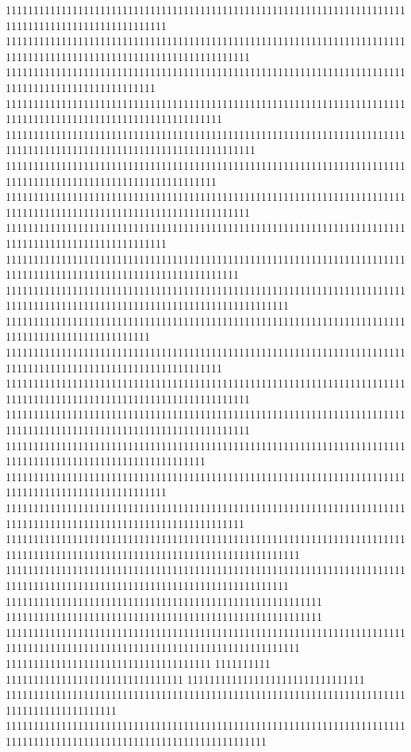 11111111111111111111111111111111111111111111111111111111111111111111111111111111111111111111111111111
11111111111111111111111111111111111111111111111111111111111111111111111111111111111111111111111111111111111111111111
111111111111111111111111111111111111111111111111111111111111111111111111111111111111111111111111111
111111111111111111111111111111111111111111111111111111111111111111111111111111111111111111111111111111111111111
111111111111111111111111111111111111111111111111111111111111111111111111111111111111111111111111111111111111111111111
11111111111111111111111111111111111111111111111111111111111111111111111111111111111111111111111111111111111111
11111111111111111111111111111111111111111111111111111111111111111111111111111111111111111111111111111111111111111111
11111111111111111111111111111111111111111111111111111111111111111111111111111111111111111111111111111
111111111111111111111111111111111111111111111111111111111111111111111111111111111111111111111111111111111111111111
111111111111111111111111111111111111111111111111111111111111111111111111111111111111111111111111111111111111111111111111111
11111111111111111111111111111111111111111111111111111111111111111111111111111111111111111111111111
111111111111111111111111111111111111111111111111111111111111111111111111111111111111111111111111111111111111111
11111111111111111111111111111111111111111111111111111111111111111111111111111111111111111111111111111111111111111111
11111111111111111111111111111111111111111111111111111111111111111111111111111111111111111111111111111111111111111111
111111111111111111111111111111111111111111111111111111111111111111111111111111111111111111111111111111111111
11111111111111111111111111111111111111111111111111111111111111111111111111111111111111111111111111111
1111111111111111111111111111111111111111111111111111111111111111111111111111111111111111111111111111111111111111111
11111111111111111111111111111111111111111111111111111111111111111111111111111111111111111111111111111111111111111111111111111
111111111111111111111111111111111111111111111111111111111111111111111111111111111111111111111111111111111111111111111111111
111111111111111111111111111111111111111111111111111111111
111111111111111111111111111111111111111111111111111111111
11111111111111111111111111111111111111111111111111111111111111111111111111111111111111111111111111111111111111111111111111111
1111111111111111111111111111111111111
1111111111
11111111111111111111111111111111
11111111111111111111111111111111
11111111111111111111111111111111111111111111111111111111111111111111111111111111111111111111
11111111111111111111111111111111111111111111111111111111111111111111111111111111111111111111111111111111111111111111111
